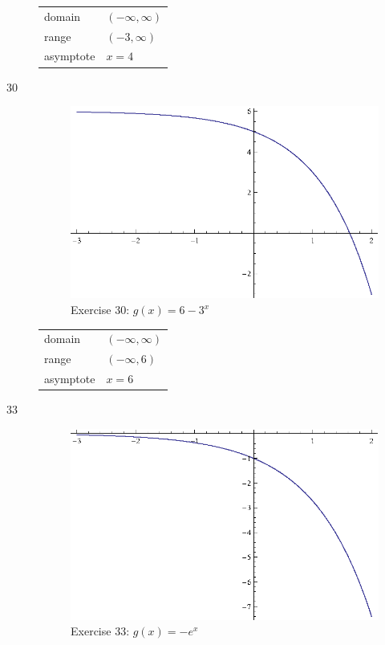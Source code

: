 \documentclass{exam}
\begin{document}
\begin{description}
        \begin{tabular}[H]{ll}
          \toprule
          domain    & $(-\infty, \infty)$ \\
          range     & $(-3, \infty)$ \\
          asymptote & $x = 4$ \\
          \bottomrule
        \end{tabular}

      \item[30] 
        \begin{figure}[H]
          \centering
          \includegraphics[scale=1.0]{exercise30.eps}
          \caption*{Exercise 30: $g(x) = 6 - 3^x$}
        \end{figure}

        \begin{tabular}[H]{ll}
          \toprule
          domain    & $(-\infty, \infty)$ \\
          range     & $(-\infty, 6)$ \\
          asymptote & $x = 6$ \\
          \bottomrule
        \end{tabular}

      \item[33] 
        \begin{figure}[H]
          \centering
          \includegraphics[scale=1.0]{exercise33.eps}
          \caption*{Exercise 33: $g(x) = -e^x$}
        \end{figure}


\end{description}
\end{document}
